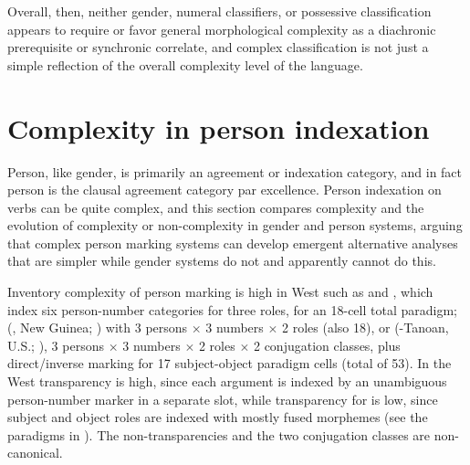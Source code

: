 \documentclass[output=collectionpaper]{langsci/langscibook}
\begin{document}
Overall, then, neither gender, numeral classifiers, or possessive classification appears to require or favor general morphological complexity as a diachronic prerequisite or synchronic correlate, and complex classification is not just a simple reflection of the overall complexity level of the language.




\section{Complexity in person indexation}
\label{sec:Nich:5}

Person, like gender, is primarily an agreement or indexation category, and in fact person is the clausal agreement category par excellence. Person indexation on verbs can be quite complex, and this section compares complexity and the evolution of complexity or non-complexity in gender and person systems, arguing that complex person marking systems can develop emergent alternative analyses that are simpler while gender systems do not and apparently cannot do this.

Inventory complexity of person marking is high in West  such as  and , which index six person-number categories for three roles, for an 18-cell total paradigm;  (, New Guinea; \citealt{Foley1991}) with 3 persons $\times$ 3 numbers $\times$ 2 roles (also 18), or  (-Tanoan, U.S.; \citealt{Watkins1984}), 3 persons $\times$ 3 numbers $\times$ 2 roles $\times$ 2 conjugation classes, plus direct/inverse marking for 17 subject-object paradigm cells (total of 53). In the West  transparency is high, since each argument is indexed by an unambiguous person-number marker in a separate slot, while transparency for  is low, since subject and object roles are indexed with mostly fused morphemes (see the paradigms in \citealt[115--116]{Watkins1984}). The  non-transparencies and the two conjugation classes are non-canonical.
\end{document}
